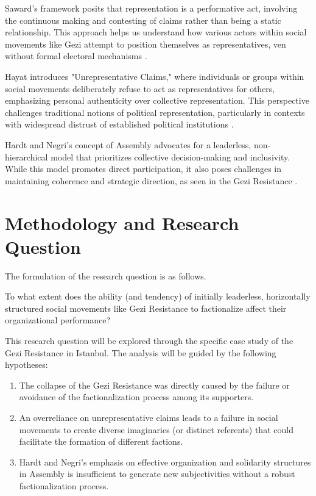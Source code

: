 Saward's framework posits that representation is a performative act, involving the continuous making and contesting of claims rather than being a static relationship. This approach helps us understand how various actors within social movements like Gezi attempt to position themselves as representatives, ven without formal electoral mechanisms \parencite[-]{saward2010}.

Hayat introduces "Unrepresentative Claims," where individuals or groups within social movements deliberately refuse to act as representatives for others, emphasizing personal authenticity over collective representation. This perspective challenges traditional notions of political representation, particularly in contexts with widespread distrust of established political institutions \parencite[1038-1043]{hayat2022}.

Hardt and Negri's concept of Assembly advocates for a leaderless, non-hierarchical model that prioritizes collective decision-making and inclusivity. While this model promotes direct participation, it also poses challenges in maintaining coherence and strategic direction, as seen in the Gezi Resistance \parencite[69]{hardt2017}.
\section{Methodology and Research Question}

The formulation of the research question is as follows.

 To what extent does the ability (and tendency) of initially leaderless, horizontally structured social movements like Gezi Resistance to factionalize affect their organizational performance?

This research question will be explored through the specific case study of the Gezi Resistance in Istanbul. The analysis will be guided by the following hypotheses:

\begin{enumerate} \item The collapse of the Gezi Resistance was directly caused by the failure or avoidance of the factionalization process among its supporters. \item An overreliance on unrepresentative claims leads to a failure in social movements to create diverse imaginaries (or distinct referents) that could facilitate the formation of different factions. \item Hardt and Negri's emphasis on effective organization and solidarity structures in Assembly is insufficient to generate new subjectivities without a robust factionalization process. \end{enumerate}

